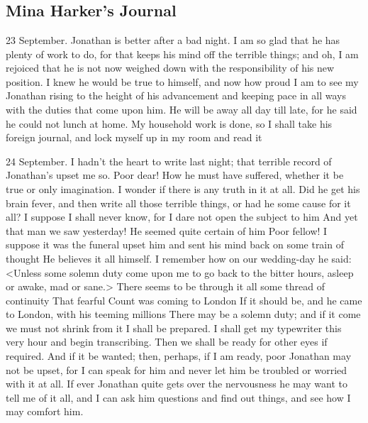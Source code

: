 \chapter[Chapter \thechapter]{}
	
\section{Mina Harker's Journal}

\begin{diary}{23 September.}
Jonathan is better after a bad night. I am so glad that he has plenty of work to do, for that keeps his mind off the terrible things; and oh, I am rejoiced that he is not now weighed down with the responsibility of his new position. I knew he would be true to himself, and now how proud I am to see my Jonathan rising to the height of his advancement and keeping pace in all ways with the duties that come upon him. He will be away all day till late, for he said he could not lunch at home. My household work is done, so I shall take his foreign journal, and lock myself up in my room and read it
	\end{diary}

\begin{diary}{24 September.}
I hadn't the heart to write last night; that terrible record of Jonathan's upset me so. Poor dear! How he must have suffered, whether it be true or only imagination. I wonder if there is any truth in it at all. Did he get his brain fever, and then write all those terrible things, or had he some cause for it all? I suppose I shall never know, for I dare not open the subject to him And yet that man we saw yesterday! He seemed quite certain of him Poor fellow! I suppose it was the funeral upset him and sent his mind back on some train of thought He believes it all himself. I remember how on our wedding-day he said: <Unless some solemn duty come upon me to go back to the bitter hours, asleep or awake, mad or sane.> There seems to be through it all some thread of continuity That fearful Count was coming to London If it should be, and he came to London, with his teeming millions There may be a solemn duty; and if it come we must not shrink from it I shall be prepared. I shall get my typewriter this very hour and begin transcribing. Then we shall be ready for other eyes if required. And if it be wanted; then, perhaps, if I am ready, poor Jonathan may not be upset, for I can speak for him and never let him be troubled or worried with it at all. If ever Jonathan quite gets over the nervousness he may want to tell me of it all, and I can ask him questions and find out things, and see how I may comfort him.

\end{diary}
